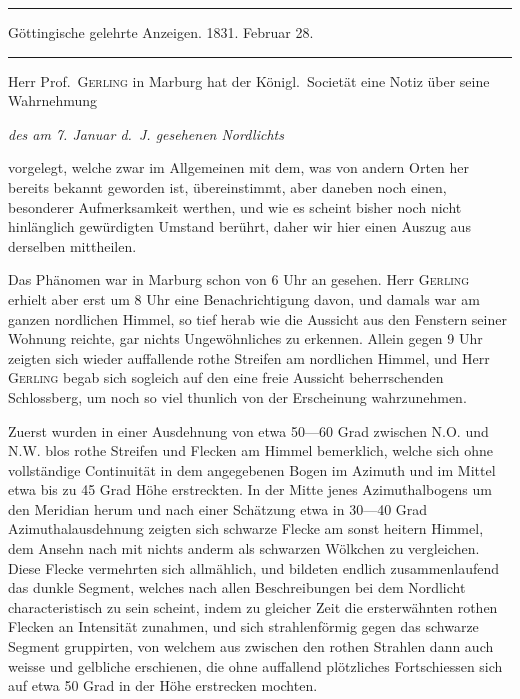 \begin{center}
\hrule\vspace{2mm}
Göttingische gelehrte Anzeigen. 1831. Februar 28.
\vspace{2mm}\hrule\vspace{5mm}
\end{center}
Herr Prof.\ \textsc{Gerling} in Marburg hat der Königl.\ Societät eine Notiz über seine Wahrnehmung
\begin{center}\itshape des am 7. Januar d.\ J. gesehenen Nordlichts\end{center}
\noindent vorgelegt, welche zwar im Allgemeinen mit dem, was von andern Orten her bereits bekannt geworden ist, übereinstimmt, aber daneben noch einen, besonderer Aufmerksamkeit werthen, und wie es scheint bisher noch nicht hinlänglich gewürdigten Umstand berührt, daher wir hier einen Auszug aus derselben mittheilen.

Das Phänomen war in Marburg schon von 6 Uhr an gesehen. Herr \textsc{Gerling} erhielt aber erst um 8 Uhr eine Benachrichtigung davon, und damals war am ganzen nordlichen Himmel, so tief herab wie die Aussicht aus den Fenstern seiner Wohnung reichte, gar nichts Ungewöhnliches zu erkennen. Allein gegen 9 Uhr zeigten sich wieder auffallende rothe Streifen am nordlichen Himmel, und Herr \textsc{Gerling} begab sich sogleich auf den eine freie Aussicht beherrschenden Schlossberg, um noch so viel thunlich von der Erscheinung wahrzunehmen.

Zuerst wurden in einer Ausdehnung von etwa 50—60 Grad zwischen N.O. und N.W. blos rothe Streifen und Flecken am Himmel bemerklich, welche sich ohne vollständige Continuität in dem angegebenen Bogen im Azimuth und im Mittel etwa bis zu 45 Grad Höhe erstreckten. In der Mitte jenes Azimuthalbogens um den Meridian herum und nach einer Schätzung etwa in 30—40 Grad Azimuthalausdehnung zeigten sich schwarze Flecke am sonst heitern Himmel, dem Ansehn nach mit nichts anderm als schwarzen Wölkchen zu vergleichen. Diese Flecke vermehrten sich allmählich, und bildeten endlich zusammenlaufend das dunkle Segment, welches nach allen Beschreibungen bei dem Nordlicht characteristisch zu sein scheint, indem zu gleicher Zeit die ersterwähnten rothen Flecken an Intensität zunahmen, und sich strahlenförmig gegen das schwarze Segment gruppirten, von welchem aus zwischen den rothen Strahlen dann auch weisse und gelbliche erschienen, die ohne auffallend plötzliches Fortschiessen sich auf etwa 50 Grad in der Höhe erstrecken mochten.

